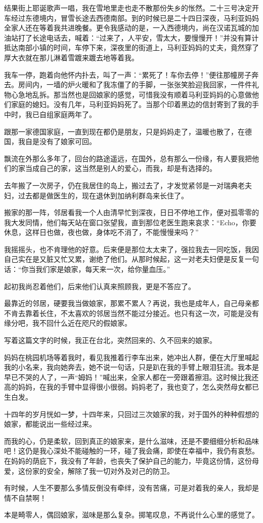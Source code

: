 \par 结果街上耶诞歌声一唱，我在雪地里走也走不散那份失乡的怅然。二十三号决定开车经过东德境内，冒雪长途去西德南部。到的时候已是二十四日深夜，马利亚妈妈全家人还在等着我共进晚餐。更令我感动的是，一入西德境内，尚在汉诺瓦城的加油站打了长途电话去，喊着：“过来了，人平安，雪太大，要慢慢开！”并没有算计抵达南部小镇的时间，车停下来，深夜里的街道上，马利亚妈妈的丈夫，竟然穿了厚大衣就在那儿淋着雪踱来踱去地等着我。
\par 我车一停，跑着向他怀内扑去，叫了一声：“累死了！车你去停！”便往那幢房子奔去。房间内，一墙的炉火暖和了我冻僵了的手脚，一张张笑脸迎我回家，一件件礼物心急地乱拆。那当然也是回娘家的感觉，可惜我没有顺着马利亚妈妈的心意做他们家庭的媳妇。没有几年，马利亚妈妈死了。当那个印着黑边的信封寄到了我的手中时，我已自组家庭两年了。
\par 跟那一家德国家庭，一直到现在都仍是朋友，只是妈妈走了，温暖也散了，在德国，我自是没有了娘家可回。
\par 飘流在外那么多年了，回台的路途遥远，在国外，总有那么一份缘，有人要我把他们的家当成自己的家，这当然是别人的爱心，而我，却是有选择的。
\par 去年搬了一次房子，仍在我居住的岛上，搬过去了，才发觉紧邻是一对瑞典老夫妇，过去都是做医生的，现在退休到加纳利群岛来长住了。
\par 搬家的那一阵，邻居看我一个人由清早忙到深夜，日日不停地工作，便对孤零零的我大发同情，他们每天站在窗口张望我，直到那位老医生跑来哀求：“Echo，你要休息，这样日也做，夜也做，身体吃不消了，不能慢慢来吗？”
\par 我摇摇头，也不肯理他的好意。后来便是那位太太来了，强拉我去一同吃饭，我因自己实在是又脏又忙又累，谢绝了他们。从那时候起，这一对老夫妇便是反复一句话：“你当我们家是娘家，每天来一次，给你量血压。”
\par 起初我尚忍着他们，后来他们认真来照顾我，更是不答应了。
\par 最靠近的邻居，硬要我当做娘家，那累不累人？再说，我也是成年人，自己母亲都不肯去靠着长住，不太喜欢的邻居当然不能过分接近。也只有这一次，可能是没有缘分吧，我不回什么近在咫尺的假娘家。
\par 写着这篇文字的时候，我正在台北，突然回来的、久不回来的娘家。
\par 妈妈在桃园机场等着我时，看见我推着行李车出来，她冲出人群，便在大厅里喊起我的小名来，我向她奔去，她不说一句话，只是趴在我的手臂上眼泪狂流。我本是早已不哭的人了，一声“姆妈！”喊出来，全家人都在一旁跟着擦泪。这时候比我还高的妈妈，在我的手臂中显得很小很弱。妈妈老了，我也变了，怎么突然母女都已生白发。
\par 十四年的岁月恍如一梦，十四年来，只回过三次娘家的我，对于国外的种种假想的娘家，都能说出一些经过来。
\par 而我的心，仍是柔软，回到真正的娘家来，是什么滋味，还是不要细细分析和品味吧！这仍是我心深处不能碰触的一环，碰了我会痛，即使在幸福中，我仍有哀愁。在妈妈的荫庇下，我没有了年龄，也丧失了保护自己的能力，毕竟这份情，这份母爱，这份家的安全，解除了我一切对外及对己的防卫。
\par 有时候，人生不要那么多情反倒没有牵绊，没有苦痛，可是对着我的亲人，我却是情不自禁啊！
\par 本是畸零人，偶回娘家，滋味是那么复杂。掷笔叹息，不再说什么心里的感觉了。



